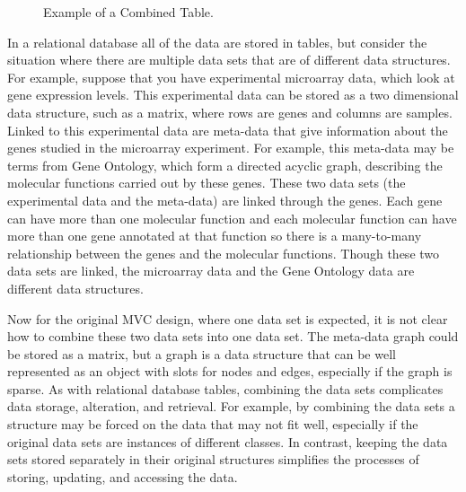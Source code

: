 \documentclass{article}[11pt]
\begin{document}

\begin{figure}[ht]
  \begin{center}
    \caption{ Example of a Combined Table. }
    \label{Fig:OneDBTab}
  \end{center}
\end{figure}

In a relational database all of the data are stored in tables, but consider the
situation where there are multiple data sets that are of different data
structures.  For example, suppose that you have experimental microarray data,
which look at gene expression levels.  This experimental data can be
stored as a two dimensional data structure, such as a matrix, where rows are
genes and columns are samples.  Linked to this experimental data are meta-data
that give information about the genes studied in the microarray experiment.
For example, this meta-data may be terms from Gene Ontology, which form a
directed acyclic graph, describing the molecular functions carried out by
these genes.  These two data sets (the experimental data and the meta-data)
are linked through the genes.  Each gene can have more than one molecular
function and each molecular function can have more than one gene annotated at
that function so there is a many-to-many relationship between the genes and
the molecular functions.  Though these two data sets are linked, the
microarray data and the Gene Ontology data are different data structures.   

Now for the original MVC design, where one data set is expected, it is not
clear how to combine these two data sets into one data set.  The meta-data
graph could be stored as a matrix, but a graph is a data structure that can be
well represented as an object with slots for nodes and edges, especially if
the graph is sparse.  As with relational database tables, combining the data
sets complicates data storage, alteration, and retrieval.  For example, by
combining the data sets a structure may be forced on the data that may not fit
well, especially if the original data sets are instances of different classes.
In contrast, keeping the data sets stored separately in their original
structures simplifies the processes of storing, updating, and accessing the
data.   
\end{document}
